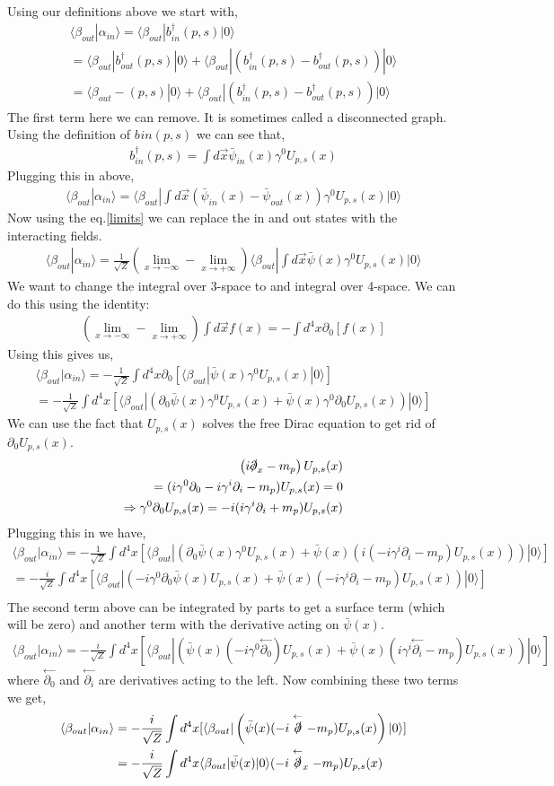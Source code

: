 \documentclass{article}
\numberwithin{equation}{section}
\newcommand{\direq}[2]{\left(i \slashed{\partial}_{#1} - m_p  \right) #2}
\newcommand{\pxb}{\bar{\psi}(x)}
\newcommand{\pinxb}{\bar{\psi}_{in}(x)}
\newcommand{\poutxb}{\bar{\psi}_{out}(x)}
\newcommand{\beq}[1]{\begin{equation} \begin{aligned} #1 \end{aligned} \end{equation}}
\newcommand{\sqz}{\sqrt{Z}}
\newcommand{\intdfx}{\int d^4 x}
\newcommand{\intdtx}{\int d \vec{x}}
\newcommand{\bkt}[2]{\langle #1| #2  \rangle}
\newcommand{\bout}{\beta_{out}}
\newcommand{\ain}{\alpha_{in}}
\newcommand{\brkt}[3]{\langle #1 | #2 | #3 \rangle}
\newcommand{\bind}{b_{in}^{\dagger}(p,s)}
\newcommand{\boutd}{b_{out}^{\dagger}(p,s)}
\newcommand{\ups}{U_{p,s}(x)}
\newcommand{\dz}{\partial_{0}}
\newcommand{\di}{\partial_{i}}
\newcommand{\ldi}{\stackrel{\leftarrow}{\partial_{i}}}
\newcommand{\ldz}{\stackrel{\leftarrow}{\partial_{0}}}
\newcommand{\lds}[1]{\stackrel{\leftarrow}{\slashed{\partial}}_{#1}}
\begin{document}
Using our definitions above we start with,
\beq{
    \bkt{\bout}{\ain} = \brkt{\bout}{\bind}{0} \\
    =\brkt{\bout}{\boutd}{0} + \brkt{\bout}{( \bind - \boutd  )}{0} \\
    =\bkt{\bout - (p,s)}{0} + \brkt{\bout}{( \bind - \boutd  )}{0} 
}
The first term here we can remove. It is sometimes called a disconnected graph. Using the definition of $b_{}in(p,s)$ we can see that,
\beq{
    \bind = \intdtx \pinxb \gamma^0 U_{p,s}(x)
}
Plugging this in above,
\beq{
    \bkt{\bout}{\ain} = \brkt{\bout}{\intdtx (\pinxb - \poutxb) \gamma^0 \ups   }{0}
}
Now using the eq.\ref{limits} we can replace the in and out states with the interacting fields.
\beq{
    \bkt{\bout}{\ain} = \frac{1}{\sqz} \left( \lim_{x \to -\infty} - \lim_{x \to +\infty} \right) \brkt{\bout}{\intdtx  \pxb \gamma^0 \ups}{0}
}
We want to change the integral over 3-space to and integral over 4-space. We can do this using the identity:
\beq{
    \left( \lim_{x \to -\infty} - \lim_{x \to +\infty} \right) \intdtx f(x) = -\intdfx \dz [f(x)] 
}
Using this gives us,
\beq{
    \bkt{\bout}{\ain} = - \frac{1}{\sqz} \intdfx \dz [\brkt{\bout}{ \pxb \gamma^0 \ups }{0} ] \\
    = - \frac{1}{\sqz} \intdfx [\brkt{\bout}{\left(   \dz \pxb \gamma^0 \ups +  \pxb \gamma^0 \dz \ups \right)}{0} ]
}
We can use the fact that $\ups$ solves the free Dirac equation to get rid of $\dz \ups$.
\beq{
    \direq{x}{\ups} \\
    =(i \gamma^0 \dz - i \gamma^i \di - m_p) \ups = 0 \\
    \Rightarrow \gamma^0 \dz \ups = -i( i \gamma^i \di + m_p)\ups
}
Plugging this in we have,
\beq{
    \bkt{\bout}{\ain} =- \frac{1}{\sqz} \intdfx [\brkt{\bout}{\left( 
    \dz \pxb \gamma^0 \ups +  \pxb (i( -i \gamma^i \di - m_p)\ups)
    \right)}{0} ] \\
    =- \frac{i}{\sqz} \intdfx [\brkt{\bout}{\left( 
    -i\gamma^0 \dz \pxb \ups +  \pxb ( -i \gamma^i \di - m_p)\ups
    \right)}{0} ] \\
}
The second term above can be integrated by parts to get a surface term (which will be zero) and another term with the derivative acting on $\pxb$.
\beq{
    \bkt{\bout}{\ain} =- \frac{i}{\sqz} \intdfx [\brkt{\bout}{\left( 
     \pxb (-i\gamma^0 \ldz) \ups +  \pxb ( i \gamma^i \ldi - m_p)\ups
    \right)}{0} ]
} 
where $\ldz$ and $\ldi$ are derivatives acting to the left. Now combining these two terms we get,
\beq{
    \bkt{\bout}{\ain} &=- \frac{i}{\sqz} \intdfx [\brkt{\bout}{\left( 
     \pxb (-i \lds{} - m_p) \ups
    \right)}{0} ] \\
    &= - \frac{i}{\sqz} \intdfx \brkt{\bout}{\pxb}{0} (-i \lds{x} - m_p) \ups
} 
\end{document}
